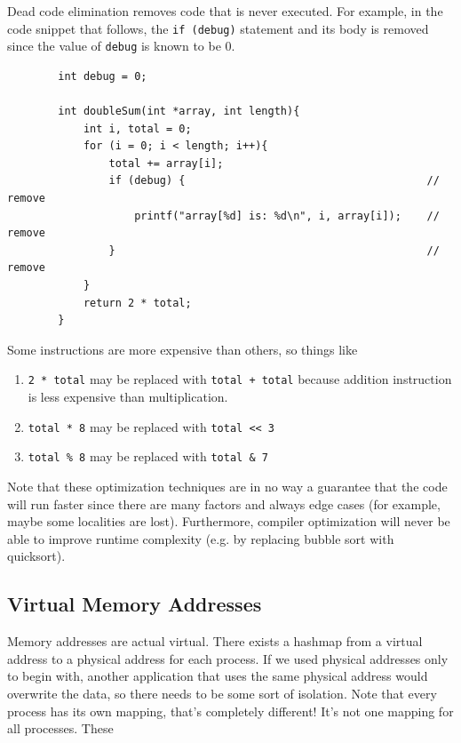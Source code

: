 \documentclass{article}
\begin{document}
    \begin{definition}
      Dead code elimination removes code that is never executed. For example, in the code snippet that follows, the \texttt{if (debug)} statement and its body is removed since the value of \texttt{debug} is known to be 0.
      \begin{lstlisting}
        int debug = 0;

        int doubleSum(int *array, int length){
            int i, total = 0;
            for (i = 0; i < length; i++){
                total += array[i];
                if (debug) {                                      // remove 
                    printf("array[%d] is: %d\n", i, array[i]);    // remove 
                }                                                 // remove
            }
            return 2 * total;
        }
      \end{lstlisting}
    \end{definition}

    \begin{definition}
      Some instructions are more expensive than others, so things like 
      \begin{enumerate}
        \item \texttt{2 * total} may be replaced with \texttt{total + total} because addition instruction is less expensive than multiplication. 
        \item \texttt{total * 8} may be replaced with \texttt{total << 3} 
        \item \texttt{total \% 8} may be replaced with \texttt{total \& 7}
      \end{enumerate}
    \end{definition}

    Note that these optimization techniques are in no way a guarantee that the code will run faster since there are many factors and always edge cases (for example, maybe some localities are lost). Furthermore, compiler optimization will never be able to improve runtime complexity (e.g. by replacing bubble sort with quicksort). 

  \subsection{Virtual Memory Addresses}

    Memory addresses are actual virtual. There exists a hashmap from a virtual address to a physical address for each process. If we used physical addresses only to begin with, another application that uses the same physical address would overwrite the data, so there needs to be some sort of isolation. Note that every process has its own mapping, that's completely different! It's not one mapping for all processes. These 
\end{document}

